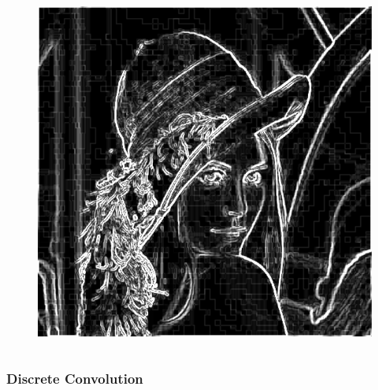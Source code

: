 \documentclass[aspectratio=169]{beamer}
\newcommand\imageright[1]{ %
    \caption*{\scalebox{.5}{\textcolor{lightgray}{\textcopyright~#1}}} %
}
\begin{document}
\begin{frame}
\begin{columns}
\begin{column}{0.38\textwidth}
\begin{figure}
            \includegraphics[height=0.38\textheight]{sobel.png}
        \end{figure}
    \end{column}
\end{columns}
\end{frame}

\begin{frame}
    \frametitle{Discrete Convolution}
    \begin{figure}
        \centering
        \imageright{Machine Learning Guru}
    \end{figure}
\end{frame}
\end{document}
